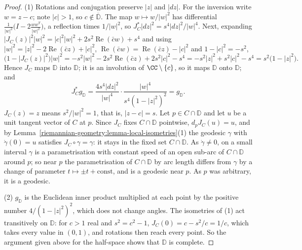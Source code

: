 \begin{proof}
(1) Rotations and conjugation preserve $|z|$ and $|dz|$. For the inversion write $w = z - c$; note $|c| > 1$, so $c \notin \overline{\mathbb{D}}$. The map $w \mapsto w/|w|^2$ has differential
$\frac{1}{|w|^2}\bigl(I - 2\frac{ww^T}{|w|^2}\bigr)$, a reflection times $1/|w|^2$, so $J_C^*|dz|^2 = s^4|dz|^2/|w|^4$. Next, expanding $|J_C(z)|^2|w|^2 = |c|^2|w|^2 + 2s^2\operatorname{Re}(\bar cw) + s^4$ and
using $|w|^2 = |z|^2 - 2\operatorname{Re}(\bar cz) + |c|^2$, $\operatorname{Re}(\bar cw) = \operatorname{Re}(\bar cz) - |c|^2$ and $1 - |c|^2 = -s^2$,
\[
\bigl(1 - |J_C(z)|^2\bigr)|w|^2 = -s^2|w|^2 - 2s^2\operatorname{Re}(\bar cz) + 2s^2|c|^2 - s^4 = -s^2|z|^2 + s^2|c|^2 - s^4 = s^2\bigl(1 - |z|^2\bigr).
\]
Hence $J_C$ maps $\mathbb{D}$ into $\mathbb{D}$; it is an involution of $\CC \setminus \{c\}$, so it maps $\mathbb{D}$ onto $\mathbb{D}$; and
\[
J_C^*g_{\mathbb{D}} = \frac{4s^4|dz|^2}{|w|^4} \cdot \frac{|w|^4}{s^4(1 - |z|^2)^2} = g_{\mathbb{D}} .
\]
$J_C(z) = z$ means $s^2/|w|^2 = 1$, that is, $|z - c| = s$. Let $p \in C \cap \mathbb{D}$ and let $u$ be a unit tangent vector of $C$ at $p$. Since $J_C$ fixes $C \cap \mathbb{D}$ pointwise, $d_pJ_C(u) = u$,
and by Lemma~\ref{riemannian-geometry:lemma-local-isometries}(1) the geodesic $\gamma$ with $\dot\gamma(0) = u$ satisfies $J_C \circ \gamma = \gamma$: it stays in the fixed set $C \cap \mathbb{D}$. As
$\dot\gamma \neq 0$, on a small interval $\gamma$ is a parametrisation with constant speed of an open sub-arc of $C \cap \mathbb{D}$ around $p$; so near $p$ the parametrisation of $C \cap \mathbb{D}$ by
arc length differs from $\gamma$ by a change of parameter $t \mapsto \pm t + \mathrm{const}$, and is a geodesic near $p$. As $p$ was arbitrary, it is a geodesic.

(2) $g_{\mathbb{D}}$ is the Euclidean inner product multiplied at each point by the positive number $4/(1 - |z|^2)^2$, which does not change angles. The isometries of (1) act transitively on
$\mathbb{D}$: for $c > 1$ real and $s^2 = c^2 - 1$, $J_C(0) = c - s^2/c = 1/c$, which takes every value in $(0, 1)$, and rotations then reach every point. So the argument given above for the half-space
shows that $\mathbb{D}$ is complete.


\end{proof}
